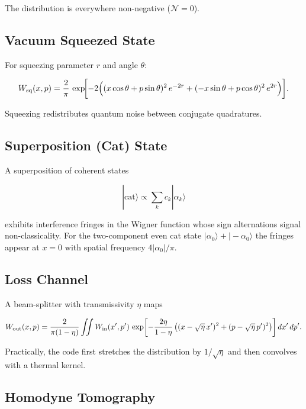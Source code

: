 \documentclass[12pt,a4paper]{article}
\begin{document}
The distribution is everywhere non-negative ($\mathcal{N}=0$).

\subsection{Vacuum Squeezed State}

For squeezing parameter $r$ and angle $\theta$:

\begin{equation}
  W_{\rm sq}(x,p) = \frac{2}{\pi}\,
    \exp\!\biggl[-2\Bigl((x\cos\theta+p\sin\theta)^2\,e^{-2r}
                         +(-x\sin\theta+p\cos\theta)^2\,e^{2r}\Bigr)\biggr].
  \label{eq:wigner_squeezed}
\end{equation}

Squeezing redistributes quantum noise between conjugate quadratures.

\subsection{Superposition (Cat) State}

A superposition of coherent states

\begin{equation}
  |\mathrm{cat}\rangle \propto \sum_k c_k |\alpha_k\rangle
  \label{eq:cat_state}
\end{equation}

exhibits interference fringes in the Wigner function whose sign alternations signal non-classicality. For the two-component even cat state $|\alpha_0\rangle+|-\alpha_0\rangle$ the fringes appear at $x=0$ with spatial frequency $4|\alpha_0|/\pi$.

\subsection{Loss Channel}

A beam-splitter with transmissivity $\eta$ maps

\begin{equation}
  W_{\rm out}(x,p) = \frac{2}{\pi(1-\eta)}
  \iint W_{\rm in}(x',p')\,
  \exp\!\left[-\frac{2\eta}{1-\eta}\left((x-\sqrt{\eta}\,x')^2+(p-\sqrt{\eta}\,p')^2\right)\right]
  dx'\,dp'.
  \label{eq:loss}
\end{equation}

Practically, the code first stretches the distribution by $1/\sqrt{\eta}$ and then convolves with a thermal kernel.

\subsection{Homodyne Tomography}
\end{document}
